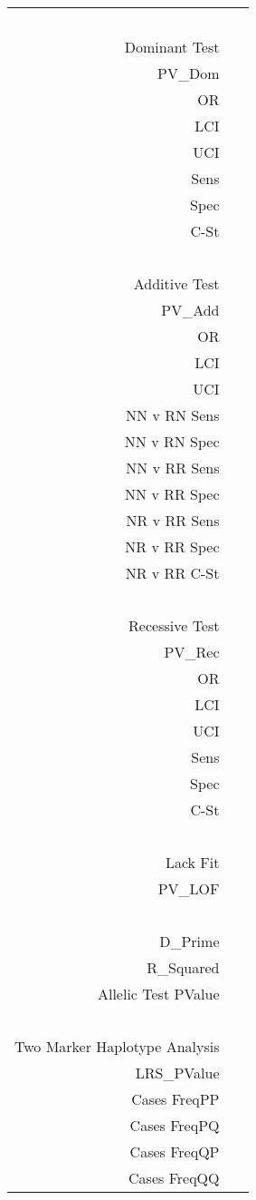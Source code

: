 \begin{supertabular}{r p{5in}}
  ~ & ~ \\
  Dominant Test & ~ \\
    PV\_Dom  &  \\
    OR  &  \\
    LCI  &  \\
    UCI  &  \\
    Sens  &  \\
    Spec  &  \\
    C-St  &  \\
  ~ & ~ \\
  Additive Test & ~ \\
    PV\_Add  &  \\
    OR  &  \\
    LCI  &  \\
    UCI  &  \\
    NN v RN Sens  &  \\
    NN v RN Spec  &  \\
    NN v RR Sens  &  \\
    NN v RR Spec  &  \\
    NR v RR Sens  &  \\
    NR v RR Spec  &  \\
    NR v RR C-St  &  \\
  ~ & ~ \\
  Recessive Test & ~ \\
    PV\_Rec  &  \\
    OR  &  \\
    LCI  &  \\
    UCI  &  \\
    Sens  &  \\
    Spec  &  \\
    C-St  &  \\
  ~ & ~ \\
  Lack Fit & ~ \\
    PV\_LOF  &  \\
  ~ & ~ \\
    D\_Prime  &  \\
    R\_Squared  &  \\
    Allelic Test PValue  &  \\
  ~ & ~ \\
  Two Marker Haplotype Analysis & ~ \\
    LRS\_PValue  &  \\
    Cases FreqPP  &  \\
    Cases FreqPQ  &  \\
    Cases FreqQP  &  \\
    Cases FreqQQ  &  \\

\end{supertabular}
